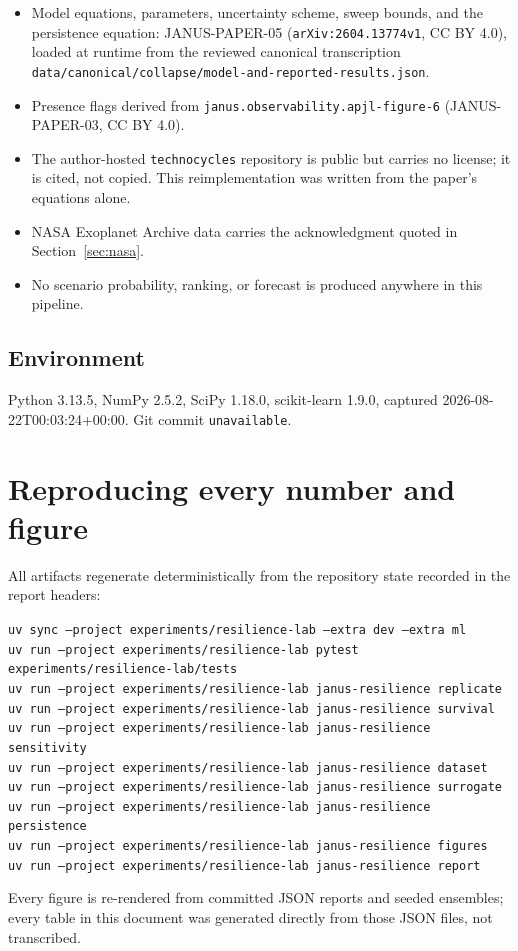 \documentclass[11pt]{article}
\begin{document}
\begin{itemize}
  \item Model equations, parameters, uncertainty scheme, sweep bounds, and the
        persistence equation: JANUS-PAPER-05 (\texttt{arXiv:2604.13774v1}, CC BY
        4.0), loaded at runtime from the reviewed canonical transcription
        \texttt{data/canonical/collapse/model-and-reported-results.json}.
  \item Presence flags derived from \texttt{janus.observability.apjl-figure-6}
        (JANUS-PAPER-03, CC BY 4.0).
  \item The author-hosted \texttt{technocycles} repository is public but carries no
        license; it is cited, not copied. This reimplementation was written from the
        paper's equations alone.
  \item NASA Exoplanet Archive data carries the acknowledgment quoted in
        Section~\ref{sec:nasa}.
  \item No scenario probability, ranking, or forecast is produced anywhere in this
        pipeline.
\end{itemize}

\subsection*{Environment}

Python 3.13.5, NumPy 2.5.2, SciPy 1.18.0,
scikit-learn 1.9.0, captured 2026-08-22T00:03:24+00:00.
Git commit \texttt{unavailable}.

\appendix
\section{Reproducing every number and figure}

All artifacts regenerate deterministically from the repository state recorded in the
report headers:

\begin{tabbing}
  \texttt{uv sync --project experiments/resilience-lab --extra dev --extra ml} \\
  \texttt{uv run --project experiments/resilience-lab pytest experiments/resilience-lab/tests} \\
  \texttt{uv run --project experiments/resilience-lab janus-resilience replicate} \\
  \texttt{uv run --project experiments/resilience-lab janus-resilience survival} \\
  \texttt{uv run --project experiments/resilience-lab janus-resilience sensitivity} \\
  \texttt{uv run --project experiments/resilience-lab janus-resilience dataset} \\
  \texttt{uv run --project experiments/resilience-lab janus-resilience surrogate} \\
  \texttt{uv run --project experiments/resilience-lab janus-resilience persistence} \\
  \texttt{uv run --project experiments/resilience-lab janus-resilience figures} \\
  \texttt{uv run --project experiments/resilience-lab janus-resilience report} \\
\end{tabbing}

Every figure is re-rendered from committed JSON reports and seeded ensembles; every
table in this document was generated directly from those JSON files, not transcribed.
\end{document}
